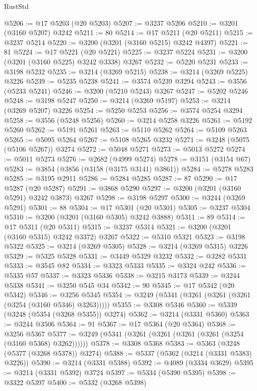 \begin{lexlean}{RustStd}
\begin{coremodule}
{\begin{coremodule}
{{{{{{{{{{{{{{{{{{{{{{{{{@5206 := @17 @5203 (@20 @5203)
@5207 := @3237 @5206
@5210 := @3201 (@3160 @5207) @3242
@5211 := 80
@5214 := @17 @5211 (@20 @5211)
@5215 := @3237 @5214
@5220 := @3200 (@3201 (@3160 @5215) @3242 @4397)
@5221 := 81
@5224 := @17 @5221 (@20 @5221)
@5225 := @3237 @5224
@5231 := @3200 (@3201 (@3160 @5225) @3242 @3338) @3267
@5232 := @5220 @5231
@5233 := @3198 @5232
@5235 := @3214 (@3269 @5215)
@5238 := @3214 (@3269 @5225) @3226
@5239 := @5235 @5238
@5241 := @3574 @5239 @3294
@5243 := @3556 (@5233 @5241)
@5246 := @3200 (@5210 @5243) @3267
@5247 := @5202 @5246
@5248 := @3198 @5247
@5250 := @3214 (@3269 @5197)
@5253 := @3214 (@3269 @5207) @3226
@5254 := @5250 @5253
@5256 := @3574 @5254 @3294
@5258 := @3556 (@5248 @5256)
@5260 := @3214 @5258 @3226
@5261 := @5192 @5260
@5262 := @5191 @5261
@5263 := @5110 @5262
@5264 := @5109 @5263
@5265 := @5095 @5264
@5267 := @5108 @5265 @3232
@5271 := @3248 (@5075 (@5106 @5267)) @3274
@5272 := @5048 @5271
@5273 := @5013 @5272
@5274 := @5011 @5273
@5276 := @2682 (@4999 @5274)
@5278 := @3151 (@3154 @67)
@5283 := @3854 (@3856 (@3158 (@3175 @3141) @3861))
@5284 := @5278 @5283
@5285 := @3195 @2911
@5286 := @5284 @5285
@5287 := 87
@5290 := @17 @5287 (@20 @5287)
@5291 := @3868 @5290
@5297 := @3200 (@3201 (@3160 @5291) @3242 @3873) @3267
@5298 := @3198 @5297
@5300 := @3244 (@3269 @5291)
@5301 := 88
@5304 := @17 @5301 (@20 @5301)
@5305 := @3237 @5304
@5310 := @3200 (@3201 (@3160 @5305) @3242 @3888)
@5311 := 89
@5314 := @17 @5311 (@20 @5311)
@5315 := @3237 @5314
@5321 := @3200 (@3201 (@3160 @5315) @3242 @3372) @3267
@5322 := @5310 @5321
@5323 := @3198 @5322
@5325 := @3214 (@3269 @5305)
@5328 := @3214 (@3269 @5315) @3226
@5329 := @5325 @5328
@5331 := @3449 @5329 @3232
@5332 := @3282 @5331
@5333 := @3545 @82
@5334 := @3323 @5333
@5335 := @3324 @242
@5336 := @5335 @57
@5337 := @3323 @5336
@5338 := @3215 @3173
@5339 := @3244 @5338
@5341 := @3250 @545 @34
@5342 := 90
@5345 := @17 @5342 (@20 @5342)
@5346 := @3256 @5345
@5354 := @3249 (@5341 (@3261 (@3261 (@3261 (@3254 (@3160 @5346) @3263)))))
@5355 := @3308 @5346
@5360 := @5339 (@3248 (@5354 (@3268 @5355)) @3274)
@5362 := @3214 (@3331 @5360)
@5363 := @3244 @3506
@5364 := 91
@5367 := @17 @5364 (@20 @5364)
@5368 := @3256 @5367
@5377 := @3249 (@5341 (@3261 (@3261 (@3261 (@3261 (@3254 (@3160 @5368) @3262))))))
@5378 := @3308 @5368
@5383 := @5363 (@3248 (@5377 (@3268 @5378)) @3274)
@5388 := @5337 (@5362 (@3214 (@3331 @5383) @3226))
@5390 := @3214 (@3331 @5388)
@5392 := @4089 (@3334 @3629)
@5395 := @3214 (@3331 @5392) @3724
@5397 := @5334 (@5390 @5395)
@5398 := @3322 @5397
@5400 := @5332 (@3268 @5398)
}}}}}}}}}}}}}}}}}}}}}}}}}
\end{coremodule}}
\end{coremodule}
\end{lexlean}
